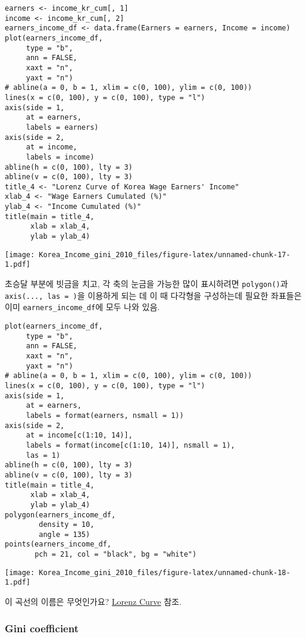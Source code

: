 \documentclass[
]{article}
\begin{document}
\begin{verbatim}
earners <- income_kr_cum[, 1] 
income <- income_kr_cum[, 2]
earners_income_df <- data.frame(Earners = earners, Income = income)
plot(earners_income_df, 
     type = "b", 
     ann = FALSE, 
     xaxt = "n", 
     yaxt = "n")
# abline(a = 0, b = 1, xlim = c(0, 100), ylim = c(0, 100))
lines(x = c(0, 100), y = c(0, 100), type = "l")
axis(side = 1, 
     at = earners, 
     labels = earners)
axis(side = 2, 
     at = income, 
     labels = income)
abline(h = c(0, 100), lty = 3)
abline(v = c(0, 100), lty = 3)
title_4 <- "Lorenz Curve of Korea Wage Earners' Income"
xlab_4 <- "Wage Earners Cumulated (%)"
ylab_4 <- "Income Cumulated (%)"
title(main = title_4, 
      xlab = xlab_4, 
      ylab = ylab_4)
\end{verbatim}

\texttt{[image: Korea\_Income\_gini\_2010\_files/figure-latex/unnamed-chunk-17-1.pdf]}

초승달 부분에 빗금을 치고, 각 축의 눈금을 가능한 많이 표시하려면
\texttt{polygon()}과 \texttt{axis(...,\ las\ =\ )}을 이용하게 되는 데 이
때 다각형을 구성하는데 필요한 좌표들은 이미
\texttt{earners\_income\_df}에 모두 나와 있음.

\begin{verbatim}
plot(earners_income_df, 
     type = "b", 
     ann = FALSE, 
     xaxt = "n", 
     yaxt = "n")
# abline(a = 0, b = 1, xlim = c(0, 100), ylim = c(0, 100))
lines(x = c(0, 100), y = c(0, 100), type = "l")
axis(side = 1, 
     at = earners, 
     labels = format(earners, nsmall = 1))
axis(side = 2, 
     at = income[c(1:10, 14)], 
     labels = format(income[c(1:10, 14)], nsmall = 1), 
     las = 1)
abline(h = c(0, 100), lty = 3)
abline(v = c(0, 100), lty = 3)
title(main = title_4, 
      xlab = xlab_4, 
      ylab = ylab_4)
polygon(earners_income_df, 
        density = 10, 
        angle = 135)
points(earners_income_df, 
       pch = 21, col = "black", bg = "white")
\end{verbatim}

\texttt{[image: Korea\_Income\_gini\_2010\_files/figure-latex/unnamed-chunk-18-1.pdf]}

이 곡선의 이름은 무엇인가요?
\href{https://en.wikipedia.org/wiki/Lorenz_curve}{Lorenz Curve} 참조.

\hypertarget{gini-coefficient}{%
\subsubsection{Gini coefficient}\label{gini-coefficient}}
\end{document}
